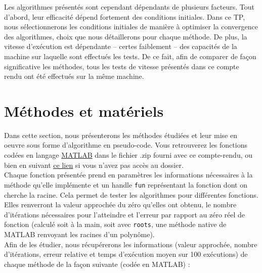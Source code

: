 \documentclass[12pt]{article}
\begin{document}
\noindent Les algorithmes présentés sont cependant dépendants de plusieurs facteurs. Tout d'abord, leur efficacité dépend fortement des conditions initiales. Dans ce TP, nous sélectionnerons les conditions initiales de manière à optimiser la convergence des algorithmes, choix que nous détaillerons pour chaque méthode. De plus, la vitesse d'exécution est dépendante – certes faiblement – des capacités de la machine sur laquelle sont effectués les tests. De ce fait, afin de comparer de façon significative les méthodes, tous les tests de vitesse présentés dans ce compte rendu ont été effectués sur la même machine.


\newpage
\section{Méthodes et matériels}
\noindent Dans cette section, nous présenterons les méthodes étudiées et leur mise en oeuvre sous forme d'algorithme en pseudo-code. Vous retrouverez les fonctions codées en langage \href{https://www.mathworks.com/products/matlab.html}{MATLAB} dans le fichier .zip fourni avec ce compte-rendu, ou bien en suivant \href{https://github.com/taupz/tp_matlab}{\underline{ce lien}} si vous n'avez pas accès au dossier.\\

\noindent Chaque fonction présentée prend en paramètres les informations nécessaires à la méthode qu'elle implémente et un handle \texttt{fun} représentant la fonction dont on cherche la racine. Cela permet de tester les algorithmes pour différentes fonctions. Elles renverront la valeur approchée du zéro qu'elles ont obtenu, le nombre d'itérations nécessaires pour l'atteindre et l'erreur par rapport au zéro réel de fonction (calculé soit à la main, soit avec \texttt{roots}, une méthode native de MATLAB renvoyant les racines d'un polynôme). \\
\noindent Afin de les étudier, nous récupérerons les informations (valeur approchée, nombre d'itérations, erreur relative et temps d'exécution moyen sur 100 exécutions) de chaque méthode de la façon suivante (codée en MATLAB) :\\
\end{document}
